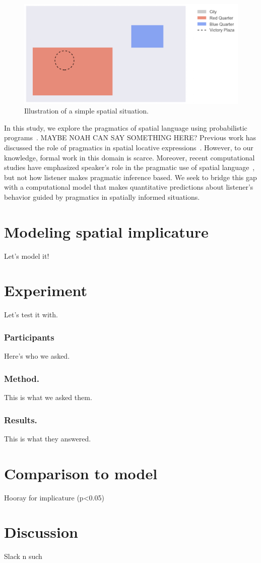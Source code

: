 \documentclass[10pt,letterpaper]{article}
\begin{document}
\begin{figure}[H]
\includegraphics[scale=.5]{figures/cityA1.png}
\caption{Illustration of a simple spatial situation.}
\label{illustration}
\end{figure}

In this study, we explore the pragmatics of spatial language using probabilistic programs~\cite{}. MAYBE NOAH CAN SAY SOMETHING HERE? Previous work has discussed the role of pragmatics in spatial locative expressions~\cite{herskovits85,herskovits87}. However, to our knowledge, formal work in this domain is scarce. Moreover, recent computational studies have emphasized speaker's role in the pragmatic use of spatial language~\cite{carstensen14,golland10}, but not how listener makes pragmatic inference based. We seek to bridge this gap with a computational model that makes quantitative predictions about listener's behavior guided by pragmatics in spatially informed situations. 

\section{Modeling spatial implicature}\label{mod}

Let's model it!

\section{Experiment}\label{sec:exps}

Let's test it with. 

\subsubsection{Participants} Here's who we asked. 

\subsubsection{Method.} This is what we asked them. 

\subsubsection{Results.} This is what they answered. 

\section{Comparison to model}

Hooray for implicature (p<0.05)

\section{Discussion}

Slack n such


\setlength{\bibleftmargin}{.125in}
\setlength{\bibindent}{-\bibleftmargin}

\end{document}
